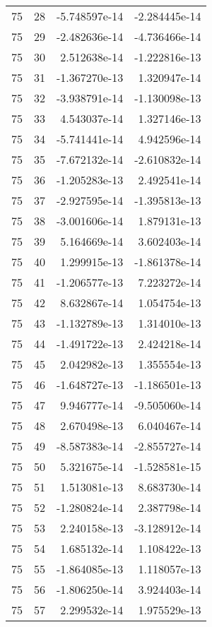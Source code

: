 \begin{tabular}{rrrr}
  75 &   28 & -5.748597e-14 & -2.284445e-14 \\
  75 &   29 & -2.482636e-14 & -4.736466e-14 \\
  75 &   30 &  2.512638e-14 & -1.222816e-13 \\
  75 &   31 & -1.367270e-13 &  1.320947e-14 \\
  75 &   32 & -3.938791e-14 & -1.130098e-13 \\
  75 &   33 &  4.543037e-14 &  1.327146e-13 \\
  75 &   34 & -5.741441e-14 &  4.942596e-14 \\
  75 &   35 & -7.672132e-14 & -2.610832e-14 \\
  75 &   36 & -1.205283e-13 &  2.492541e-14 \\
  75 &   37 & -2.927595e-14 & -1.395813e-13 \\
  75 &   38 & -3.001606e-14 &  1.879131e-13 \\
  75 &   39 &  5.164669e-14 &  3.602403e-14 \\
  75 &   40 &  1.299915e-13 & -1.861378e-14 \\
  75 &   41 & -1.206577e-13 &  7.223272e-14 \\
  75 &   42 &  8.632867e-14 &  1.054754e-13 \\
  75 &   43 & -1.132789e-13 &  1.314010e-13 \\
  75 &   44 & -1.491722e-13 &  2.424218e-14 \\
  75 &   45 &  2.042982e-13 &  1.355554e-13 \\
  75 &   46 & -1.648727e-13 & -1.186501e-13 \\
  75 &   47 &  9.946777e-14 & -9.505060e-14 \\
  75 &   48 &  2.670498e-13 &  6.040467e-14 \\
  75 &   49 & -8.587383e-14 & -2.855727e-14 \\
  75 &   50 &  5.321675e-14 & -1.528581e-15 \\
  75 &   51 &  1.513081e-13 &  8.683730e-14 \\
  75 &   52 & -1.280824e-14 &  2.387798e-14 \\
  75 &   53 &  2.240158e-13 & -3.128912e-14 \\
  75 &   54 &  1.685132e-14 &  1.108422e-13 \\
  75 &   55 & -1.864085e-13 &  1.118057e-13 \\
  75 &   56 & -1.806250e-14 &  3.924403e-14 \\
  75 &   57 &  2.299532e-14 &  1.975529e-13 \\

\end{tabular}
